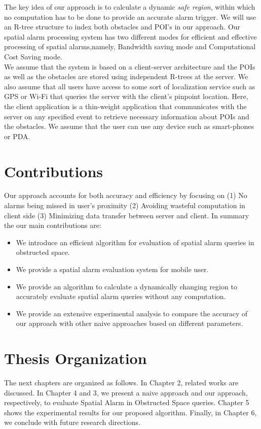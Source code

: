 The key idea of our approach is to calculate a dynamic \textit{safe region}, within which no computation has to be done to provide an accurate alarm trigger. We will use an R-tree structure to index both obstacles and POI's in our approach. Our spatial alarm processing system has two different modes for efficient and effective processing of spatial alarms,namely, Bandwidth saving mode and Computational Cost Saving mode.\\

We assume that the system is based on a client-server architecture and the POIs as well as the obstacles are stored using independent R-trees at the server. We also assume that all users have access to some sort of localization service such as GPS or Wi-Fi that queries the server with the client's pinpoint location. Here, the client application is a thin-weight application that communicates with the server on any specified event to retrieve necessary information about POIs and the obstacles. We assume that the user can use any device such as smart-phones or PDA.

\section{Contributions}

 Our approach accounts for both accuracy and efficiency by focusing on (1) No alarms being missed in user's proximity (2) Avoiding wasteful computation in client side (3) Minimizing data transfer between server and client. In summary the our main contributions are: 
\begin{itemize}
\setlength\itemsep{0em}
\item We introduce an efficient algorithm for evaluation of spatial alarm queries in obstructed space.
\item We provide a spatial alarm evaluation system for mobile user.
\item We provide an algorithm to calculate a dynamically changing region to accurately evaluate spatial alarm queries without any computation.
\item We provide an extensive experimental analysis to compare the accuracy of our approach with other naive approaches based on different parameters.
\end{itemize}

\vspace*{8pt}


\section{Thesis Organization}
\label{sec:org}

\vspace*{5pt}

The next chapters are organized as follows. In Chapter 2, related works are discussed. In Chapter 4 and 3, we present a naive approach and our approach, respectively, to evaluate Spatial Alarm in Obstructed Space queries. Chapter 5 shows the experimental results for our proposed algorithm. Finally, in Chapter 6, we conclude with future research directions.


